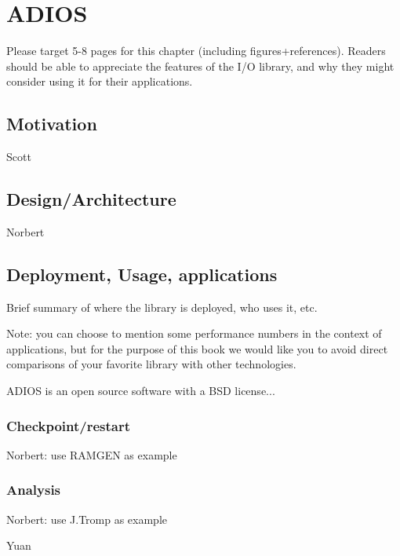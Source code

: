 
\chapter{ADIOS}
\label{part3-ch5-adios}
{\color {red}Please target 5-8 pages for this chapter (including figures+references). Readers should be able to appreciate the features of the I/O library, and why they might consider using it for their applications.}


\section{Motivation}
{\color {red}Scott}




\section{Design/Architecture}
{\color {red}Norbert}




\section{Deployment, Usage, applications}
{\color {red}Brief summary of where the library is deployed, who uses it, etc.

Note: you can choose to mention some performance numbers in the context of applications, but for the purpose of this book we would like you to avoid direct comparisons of your favorite library with other technologies.  }

ADIOS is an open source software with a BSD license...


\subsection{Checkpoint/restart}
{\color {red}Norbert: use RAMGEN as example}



\subsection{Analysis}
{\color {red}Norbert: use J.Tromp as example}

{\color {red}Yuan}



